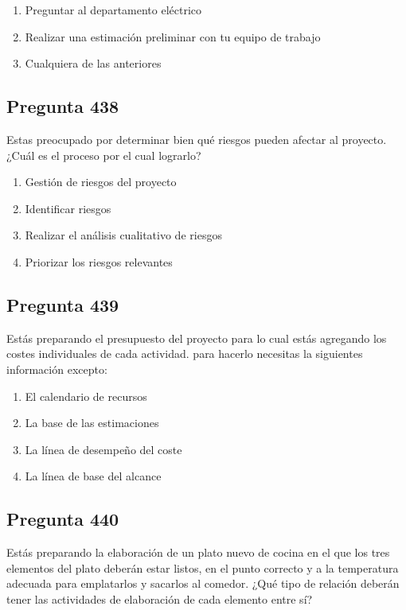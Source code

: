 \documentclass[11pt,a4paper]{article}
\begin{document}
\begin{enumerate}[label=\alph*)]
  \item Preguntar al departamento eléctrico
  \item Realizar una estimación preliminar con tu equipo de trabajo
  \item Cualquiera de las anteriores
\end{enumerate}

\subsection*{Pregunta 438}
Estas preocupado por determinar bien qué riesgos pueden afectar al proyecto. ¿Cuál es el proceso por el cual lograrlo?

\begin{enumerate}[label=\alph*)]
  \item Gestión de riesgos del proyecto
  \item Identificar riesgos
  \item Realizar el análisis cualitativo de riesgos
  \item Priorizar los riesgos relevantes
\end{enumerate}

\subsection*{Pregunta 439}
Estás preparando el presupuesto del proyecto para lo cual estás agregando los costes individuales de cada actividad. para hacerlo necesitas la siguientes información excepto:

\begin{enumerate}[label=\alph*)]
  \item El calendario de recursos
  \item La base de las estimaciones
  \item La línea de desempeño del coste
  \item La línea de base del alcance
\end{enumerate}

\subsection*{Pregunta 440}
Estás preparando la elaboración de un plato nuevo de cocina en el que los tres elementos del plato deberán estar listos, en el punto correcto y a la temperatura adecuada para emplatarlos y sacarlos al comedor. ¿Qué tipo de relación deberán tener las actividades de elaboración de cada elemento entre sí?
\end{document}

